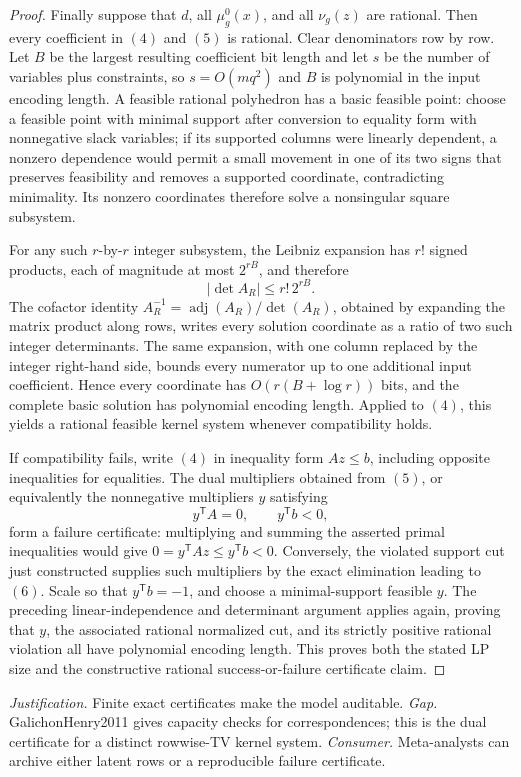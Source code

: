 \documentclass{article}
\begin{document}
\begin{proof}
Finally suppose that \(d\), all \(\mu_g^0(x)\), and all \(\nu_g(z)\) are rational.  Then every coefficient in \((4)\) and \((5)\) is rational.  Clear denominators row by row.  Let \(B\) be the largest resulting coefficient bit length and let \(s\) be the number of variables plus constraints, so \(s=O(mq^2)\) and \(B\) is polynomial in the input encoding length.  A feasible rational polyhedron has a basic feasible point: choose a feasible point with minimal support after conversion to equality form with nonnegative slack variables; if its supported columns were linearly dependent, a nonzero dependence would permit a small movement in one of its two signs that preserves feasibility and removes a supported coordinate, contradicting minimality.  Its nonzero coordinates therefore solve a nonsingular square subsystem.

For any such \(r\)-by-\(r\) integer subsystem, the Leibniz expansion has \(r!\) signed products, each of magnitude at most \(2^{rB}\), and therefore
\[
 |\det A_R|\le r!\,2^{rB}.
\]
The cofactor identity \(A_R^{-1}=\operatorname{adj}(A_R)/\det(A_R)\), obtained by expanding the matrix product along rows, writes every solution coordinate as a ratio of two such integer determinants.  The same expansion, with one column replaced by the integer right-hand side, bounds every numerator up to one additional input coefficient.  Hence every coordinate has
\(O(r(B+\log r))\) bits, and the complete basic solution has polynomial encoding length.  Applied to \((4)\), this yields a rational feasible kernel system whenever compatibility holds.

If compatibility fails, write \((4)\) in inequality form \(Az\le b\), including opposite inequalities for equalities.  The dual multipliers obtained from \((5)\), or equivalently the nonnegative multipliers \(y\) satisfying
\[
 y^{\mathsf T}A=0,\qquad y^{\mathsf T}b<0,
\]
form a failure certificate: multiplying and summing the asserted primal inequalities would give
\(0=y^{\mathsf T}Az\le y^{\mathsf T}b<0\).  Conversely, the violated support cut just constructed supplies such multipliers by the exact elimination leading to \((6)\).  Scale so that \(y^{\mathsf T}b=-1\), and choose a minimal-support feasible \(y\).  The preceding linear-independence and determinant argument applies again, proving that \(y\), the associated rational normalized cut, and its strictly positive rational violation all have polynomial encoding length.  This proves both the stated LP size and the constructive rational success-or-failure certificate claim.
\end{proof}
\par\smallskip\noindent \textit{Justification.} Finite exact certificates make the model auditable. \textit{Gap.} GalichonHenry2011 gives capacity checks for correspondences; this is the dual certificate for a distinct rowwise-TV kernel system. \textit{Consumer.} Meta-analysts can archive either latent rows or a reproducible failure certificate.
\end{document}
